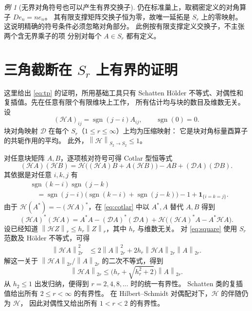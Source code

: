 \documentclass[UTF8,11pt,a4paper,fontset=fandol]{ctexart}
\theoremstyle{remark}
\newtheorem{example}[theorem]{例}
\newcommand{\DD}{\mathcal D}
\newcommand{\TriH}{\mathcal H}
\newcommand{\norm}[1]{\left\lVert #1\right\rVert}
\numberwithin{equation}{section}
\begin{document}
\begin{example}[无界对角符号也可以产生有界交换子]
仍在标准巢上，取稠密定义的对角算子 $De_n=ne_n$。
其有限支撑矩阵交换子恒为零，故唯一延拓是 $S_r$ 上的零映射。
这说明精确的符号条件必须忽略对角部分。
此例按有限支撑定义交换子，不主张两个含无界乘子的项
分别对每个 $A\in S_r$ 都有定义。
\end{example}

\appendix
\section{三角截断在 \texorpdfstring{$S_r$}{Sr} 上有界的证明}

这里给出 \eqref{eq:tp} 的证明，所用基础工具只有 Schatten H\"older
不等式、对偶性和复插值。先在任意有限个有限维块上工作，
所有估计均与块的数目及维数无关。
设
\[
 (\TriH A)_{ij}=\operatorname{sgn}(j-i)A_{ij},\qquad
 \operatorname{sgn}(0)=0.
\]
块对角映射 $\DD$ 在每个 $S_r$（$1\leq r\leq\infty$）上均为压缩映射：
它是块对角标量酉算子的共轭作用的平均。
此外，$\norm{\TriH}_{S_2\to S_2}\leq1$。

\medskip
对任意块矩阵 $A,B$，逐项核对符号可得 Cotlar 型恒等式
\begin{equation}\label{eq:cotlar}
 (\TriH A)(\TriH B)
 =\TriH\bigl((\TriH A)B+A(\TriH B)\bigr)-AB+(\DD A)(\DD B).
\end{equation}
其依据是对任意 $i,k,j$ 有
\begin{align*}
 &\operatorname{sgn}(k-i)\operatorname{sgn}(j-k)\\
 &\quad=\operatorname{sgn}(j-i)
   \bigl(\operatorname{sgn}(k-i)+\operatorname{sgn}(j-k)\bigr)
    -1+\mathbf1_{\{i=k=j\}}.
\end{align*}
由于 $\TriH(A^*)=-(\TriH A)^*$，在 \eqref{eq:cotlar} 中以 $A^*,A$
替代 $A,B$ 得到
\begin{equation}\label{eq:square}
 (\TriH A)^*(\TriH A)
 =A^*A-(\DD A)^*(\DD A)
   +\TriH\bigl((\TriH A)^*A-A^*\TriH A\bigr).
\end{equation}
设已经知道 $\norm{\TriH Z}_r\leq h_r\norm Z_r$，其中 $h_r$ 与维数无关。
对 \eqref{eq:square} 使用 $S_r$ 范数及 H\"older 不等式，可得
\begin{align*}
 \norm{\TriH A}_{2r}^{2}
 &\leq 2\norm A_{2r}^{2}
       +2h_r\norm{\TriH A}_{2r}\norm A_{2r}.
\end{align*}
解这一关于 $\norm{\TriH A}_{2r}/\norm A_{2r}$ 的二次不等式，得到
\[
 \norm{\TriH A}_{2r}\leq
 \bigl(h_r+\sqrt{h_r^2+2}\bigr)\norm A_{2r}.
\]
从 $h_2\leq1$ 出发归纳，便得到 $r=2,4,8,\ldots$ 时的统一有界性。
Schatten 类的复插值给出所有 $2\leq r<\infty$ 的有界性。
在 Hilbert--Schmidt 对偶配对下，$\TriH$ 的伴随仍为 $\TriH$，
因此对偶性又给出所有 $1<r<2$ 的有界性。
\end{document}
